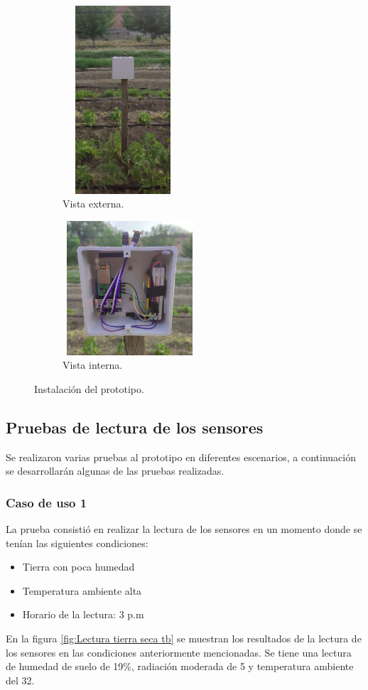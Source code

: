 \begin{figure}[h!]
  \centering
    \begin{subfigure}[b]{0.40\linewidth}
      \includegraphics[width=4.5cm, height=7cm]{./Figures/prototipo_implementacion3.png}
      \caption{Vista externa.}  
      \label{fig:Prototipo serca}
    \end{subfigure}
  \begin{subfigure}[b]{0.40\linewidth}
    \includegraphics[width=5cm, height=5cm]{./Figures/prt_serca.png}
    \caption{Vista interna.}  
    \label{fig:Prototipo serca2}
  \end{subfigure}
      \caption{Instalación del prototipo.}
    \label{fig:Instalacion del prototipo}
\end{figure}
  
\subsection{Pruebas de lectura de los sensores}
Se realizaron varias pruebas al prototipo en diferentes escenarios, a continuación se desarrollarán algunas de las pruebas realizadas.
\subsubsection{Caso de uso 1}
La prueba consistió en realizar la lectura de los sensores en un momento donde se tenían las siguientes condiciones:
\begin{itemize}
  \item Tierra con poca humedad
  \item Temperatura ambiente alta 
  \item Horario de la lectura: 3 p.m
\end{itemize}
En la figura \ref{fig:Lectura tierra seca tb} se muestran los resultados de la lectura de los sensores en las condiciones anteriormente mencionadas. Se tiene una lectura de humedad de suelo de 19\%, radiación moderada de 5 y temperatura ambiente del 32\textcelsius.

